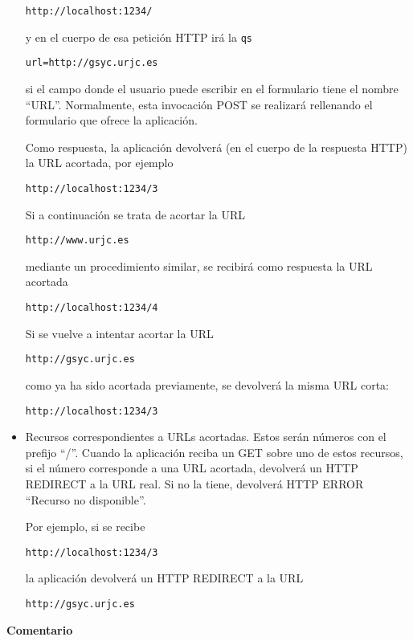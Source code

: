 \begin{itemize}
\verb|http://localhost:1234/|

y en el cuerpo de esa petición HTTP irá la \texttt{qs}

\verb|url=http://gsyc.urjc.es|

si el campo donde el usuario puede escribir en el formulario tiene el nombre ``URL''. Normalmente, esta invocación POST se realizará rellenando el formulario que ofrece la aplicación.

Como respuesta, la aplicación devolverá (en el cuerpo de la respuesta HTTP) la URL acortada, por ejemplo

\verb|http://localhost:1234/3|

Si a continuación se trata de acortar la URL

\verb|http://www.urjc.es|

mediante un procedimiento similar, se recibirá como respuesta la URL acortada

\verb|http://localhost:1234/4|

Si se vuelve a intentar acortar la URL

\verb|http://gsyc.urjc.es|

como ya ha sido acortada previamente, se devolverá la misma URL corta:

\verb|http://localhost:1234/3|

\item Recursos correspondientes a URLs acortadas. Estos serán números con el prefijo ``/''. Cuando la aplicación reciba un GET sobre uno de estos recursos, si el número corresponde a una URL acortada, devolverá un HTTP REDIRECT a la URL real. Si no la tiene, devolverá HTTP ERROR ``Recurso no disponible''.

Por ejemplo, si se recibe 

\verb|http://localhost:1234/3|

la aplicación devolverá un HTTP REDIRECT a la URL

\verb|http://gsyc.urjc.es|

\end{itemize}


\textbf{Comentario}

